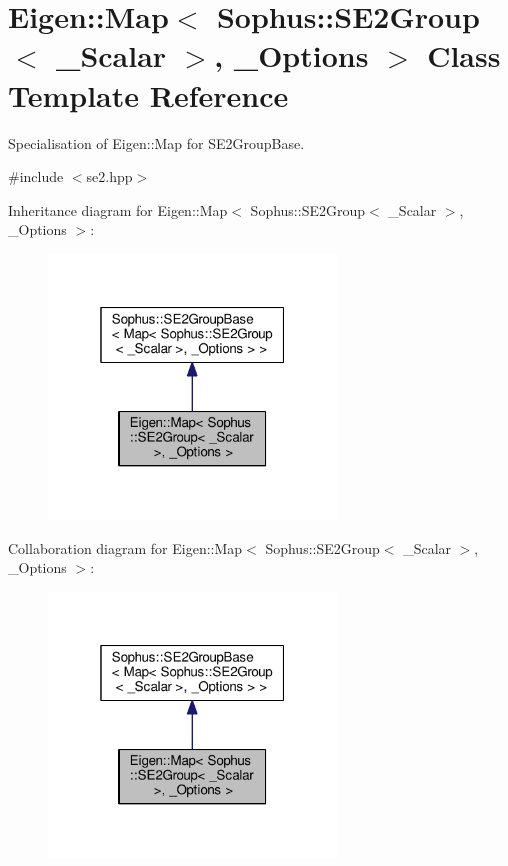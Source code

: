 \hypertarget{class_eigen_1_1_map_3_01_sophus_1_1_s_e2_group_3_01___scalar_01_4_00_01___options_01_4}{}\section{Eigen\+:\+:Map$<$ Sophus\+:\+:S\+E2\+Group$<$ \+\_\+\+Scalar $>$, \+\_\+\+Options $>$ Class Template Reference}
\label{class_eigen_1_1_map_3_01_sophus_1_1_s_e2_group_3_01___scalar_01_4_00_01___options_01_4}


Specialisation of Eigen\+::\+Map for S\+E2\+Group\+Base.  




{\ttfamily \#include $<$se2.\+hpp$>$}



Inheritance diagram for Eigen\+:\+:Map$<$ Sophus\+:\+:S\+E2\+Group$<$ \+\_\+\+Scalar $>$, \+\_\+\+Options $>$\+:
\nopagebreak
\begin{figure}[H]
\begin{center}
\leavevmode
\includegraphics[width=217pt]{class_eigen_1_1_map_3_01_sophus_1_1_s_e2_group_3_01___scalar_01_4_00_01___options_01_4__inherit__graph}
\end{center}
\end{figure}


Collaboration diagram for Eigen\+:\+:Map$<$ Sophus\+:\+:S\+E2\+Group$<$ \+\_\+\+Scalar $>$, \+\_\+\+Options $>$\+:
\nopagebreak
\begin{figure}[H]
\begin{center}
\leavevmode
\includegraphics[width=217pt]{class_eigen_1_1_map_3_01_sophus_1_1_s_e2_group_3_01___scalar_01_4_00_01___options_01_4__coll__graph}
\end{center}
\end{figure}
